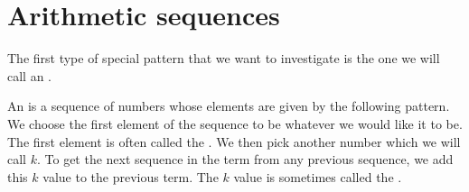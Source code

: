 \documentclass{ximera}
\begin{document}
\section{Arithmetic sequences}
The first type of special pattern that we want to investigate is the one we will call an .
\begin{definition}
An  is a sequence of numbers whose elements are given by the following pattern. We choose the first element of the sequence to be whatever we would like it to be. The first element is often called the . We then pick another number which we will call $k$. To get the next sequence in the term from any previous sequence, we add this $k$ value to the previous term. The $k$ value is sometimes called the .
\end{definition}
\end{document}
